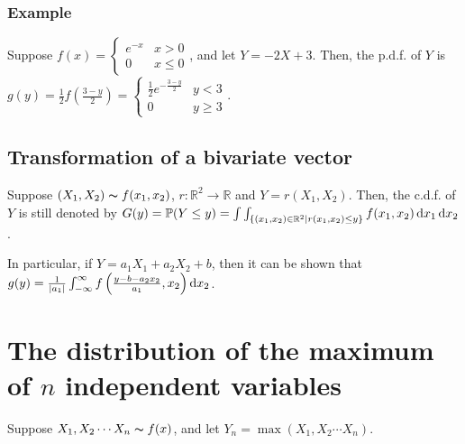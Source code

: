 \subsubsection{Example}
Suppose $f(x) = \begin{cases}e^{-x} & x > 0 \\ 0 & x \leq 0\end{cases}$, and let $Y = -2X + 3$. Then, the p.d.f. of $Y$ is $g(y) = \frac{1}{2}f\left(\frac{3 - y}{2}\right) = \begin{cases}\frac{1}{2} e^{-\frac{3 - y}{2}} & y < 3 \\ 0 & y \geq 3\end{cases}$.

\subsection{Transformation of a bivariate vector}
Suppose $(X_1, X_2) \thicksim f(x_1, x_2)$, $r: \mathbb{R}^2 \rightarrow \mathbb{R}$ and $Y = r(X_1, X_2)$. Then, the c.d.f. of $Y$ is still denoted by $G(y) = \mathbb{P}(Y \leq y) = \int \int_{\left\{(x_1, x_2) \in \mathbb{R}^2 | r(x_1, x_2) \leq y\right\}} f(x_1, x_2) \mathop{}\!\mathrm{d} x_1 \mathop{}\!\mathrm{d} x_2$.

In particular, if $Y = a_1X_1 + a_2X_2 + b$, then it can be shown that $g(y) = \frac{1}{|a_1|}\int_{-\infty}^{\infty} f\left(\frac{y - b - a_2x_2}{a_1}, x_2\right) \mathop{}\!\mathrm{d} x_2$.

\section{The distribution of the maximum of $n$ independent variables}
Suppose $X_1, X_2 \cdots X_n \thicksim f(x)$, and let $Y_n = \max(X_1, X_2 \cdots X_n)$. 


